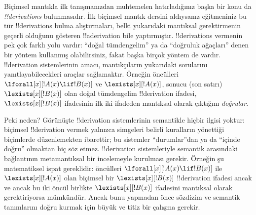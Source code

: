 Biçimsel mantıkla ilk tanışmanızdan muhtemelen hatırladığınız başka bir
konu da \emph{!!{derivation}s} bulunmasıdır. İlk biçimsel mantık
dersini aldıysanız eğitmeniniz bu tür !!{derivation}s bulma
alıştırmaları, belki yukarıdaki mantıksal gerektirmenin geçerli
olduğunu gösteren !!a{derivation} bile yaptırmıştır. !!{derivation}s
vermenin pek çok farklı yolu vardır: ``doğal tümdengelim'' ya da
``doğruluk ağaçları'' denen bir yöntem kullanmış olabilirsiniz, fakat
başka birçok yöntem de vardır. !!{derivation} sistemlerinin amacı,
mantıkçıların yukarıdaki sorularını yanıtlayabilecekleri araçlar
sağlamaktır. Örneğin öncülleri
$\lforall[x][!A(x)\lif !B(x)]$ ve $\lexists[x][!A(x)]$, sonucu (son
satırı) $\lexists[x][!B(x)]$ olan doğal tümdengelim
!!{derivation} ifadesi, $\lexists[x][!B(x)]$ ifadesinin ilk iki
ifadeden mantıksal olarak çıktığını \emph{doğrular}.

Peki neden? Görünüşte !!{derivation} sistemlerinin semantikle hiçbir
ilgisi yoktur: biçimsel !!{derivation} vermek yalnızca simgeleri
belirli kuralların yönettiği biçimlerde düzenlemekten ibarettir; bu
sistemler ``durumlar''dan ya da ``içinde doğru'' olmaktan hiç söz
etmez. !!{derivation} sistemleriyle semantik arasındaki bağlantının
metamantıksal bir incelemeyle kurulması gerekir. Örneğin şu matematiksel
ispat gereklidir: öncülleri $\lforall[x][!A(x)\lif !B(x)]$ ile
$\lexists[x][!A(x)]$ olan biçimsel bir
$\lexists[x][!B(x)]$ !!{derivation} ifadesi ancak ve ancak bu iki öncül
birlikte $\lexists[x][!B(x)]$ ifadesini mantıksal olarak gerektiriyorsa
mümkündür. Ancak bunu yapmadan önce sözdizim ve semantik tanımlarını
doğru kurmak için büyük ve titiz bir çalışma gerekir.

